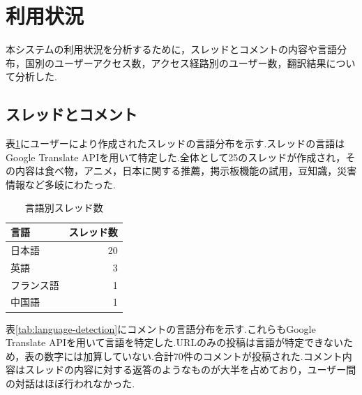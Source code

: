 \documentclass[b5paper,12pt,dvipdfmx]{jsreport}
\begin{document}
\section{利用状況}

本システムの利用状況を分析するために，スレッドとコメントの内容や言語分布，国別のユーザーアクセス数，アクセス経路別のユーザー数，翻訳結果について分析した.

\subsection{スレッドとコメント}

表\ref{tab:thread-language}にユーザーにより作成されたスレッドの言語分布を示す.スレッドの言語はGoogle Translate APIを用いて特定した.全体として25のスレッドが作成され，その内容は食べ物，アニメ，日本に関する推薦，掲示板機能の試用，豆知識，災害情報など多岐にわたった.


\begin{table}[H]
    \centering
    \caption{言語別スレッド数}
    \label{tab:thread-language}
    \begin{tabular}{|l|r|}
        \hline
        \textbf{言語} & \textbf{スレッド数} \\ \hline
        日本語       & 20               \\
        英語         & 3                 \\
        フランス語    & 1                 \\
        中国語       & 1                 \\ \hline
    \end{tabular}
\end{table}

表\ref{tab:language-detection}にコメントの言語分布を示す.これらもGoogle Translate APIを用いて言語を特定した.URLのみの投稿は言語が特定できないため，表の数字には加算していない.合計70件のコメントが投稿された.コメント内容はスレッドの内容に対する返答のようなものが大半を占めており，ユーザー間の対話はほぼ行われなかった.
\end{document}
